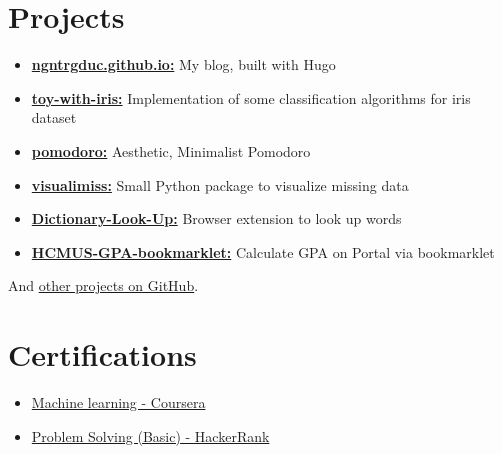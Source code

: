 \documentclass[letterpaper,11pt]{article}
\begin{document}
\section{Projects}
    \begin{itemize}
        \item \href{https://github.com/ngntrgduc/ngntrgduc.github.io}{\textbf{ngntrgduc.github.io:}} My blog, built with Hugo
        
        \item \href{https://github.com/ngntrgduc/toy-with-iris}{\textbf{toy-with-iris:}} Implementation of some classification algorithms for iris dataset
    
        \item \href{https://github.com/ngntrgduc/pomodoro}{\textbf{pomodoro:}} Aesthetic, Minimalist Pomodoro
    
        \item \href{https://github.com/ngntrgduc/visualimiss}{\textbf{visualimiss:}} Small Python package to visualize missing data 
        
        \item \href{https://github.com/ngntrgduc/Dictionary-Look-Up}{\textbf{Dictionary-Look-Up:}} Browser extension to look up words
        
        \item \href{https://github.com/ngntrgduc/HCMUS-GPA-bookmarklet}{\textbf{HCMUS-GPA-bookmarklet:}} Calculate GPA on Portal via bookmarklet
    \end{itemize}
    \vspace{-0.8em}
    And \href{https://github.com/ngntrgduc/projects}{other projects on GitHub}.


\section{Certifications}
    \begin{itemize}
        \item \href{https://coursera.org/share/c68e20d03f93ad3689a80fc68a52989c}{Machine learning - Coursera}
        
        \item \href{https://www.hackerrank.com/certificates/6286b603c4f7}{Problem Solving (Basic) - HackerRank}
    
    
    \end{itemize}
    
\end{document}

